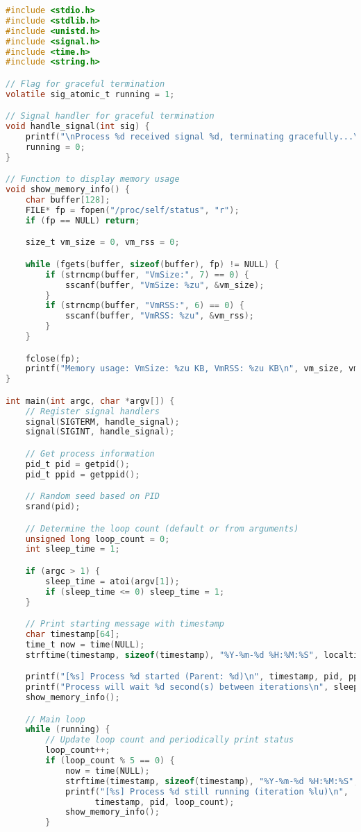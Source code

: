 \documentclass[a4paper,11pt]{article}
\begin{document}
\begin{lstlisting}[language=C, caption=Programa infinite\_loop.c]
#include <stdio.h>
#include <stdlib.h>
#include <unistd.h>
#include <signal.h>
#include <time.h>
#include <string.h>

// Flag for graceful termination
volatile sig_atomic_t running = 1;

// Signal handler for graceful termination
void handle_signal(int sig) {
    printf("\nProcess %d received signal %d, terminating gracefully...\n", getpid(), sig);
    running = 0;
}

// Function to display memory usage
void show_memory_info() {
    char buffer[128];
    FILE* fp = fopen("/proc/self/status", "r");
    if (fp == NULL) return;

    size_t vm_size = 0, vm_rss = 0;

    while (fgets(buffer, sizeof(buffer), fp) != NULL) {
        if (strncmp(buffer, "VmSize:", 7) == 0) {
            sscanf(buffer, "VmSize: %zu", &vm_size);
        }
        if (strncmp(buffer, "VmRSS:", 6) == 0) {
            sscanf(buffer, "VmRSS: %zu", &vm_rss);
        }
    }

    fclose(fp);
    printf("Memory usage: VmSize: %zu KB, VmRSS: %zu KB\n", vm_size, vm_rss);
}

int main(int argc, char *argv[]) {
    // Register signal handlers
    signal(SIGTERM, handle_signal);
    signal(SIGINT, handle_signal);

    // Get process information
    pid_t pid = getpid();
    pid_t ppid = getppid();

    // Random seed based on PID
    srand(pid);

    // Determine the loop count (default or from arguments)
    unsigned long loop_count = 0;
    int sleep_time = 1;

    if (argc > 1) {
        sleep_time = atoi(argv[1]);
        if (sleep_time <= 0) sleep_time = 1;
    }

    // Print starting message with timestamp
    char timestamp[64];
    time_t now = time(NULL);
    strftime(timestamp, sizeof(timestamp), "%Y-%m-%d %H:%M:%S", localtime(&now));

    printf("[%s] Process %d started (Parent: %d)\n", timestamp, pid, ppid);
    printf("Process will wait %d second(s) between iterations\n", sleep_time);
    show_memory_info();

    // Main loop
    while (running) {
        // Update loop count and periodically print status
        loop_count++;
        if (loop_count % 5 == 0) {
            now = time(NULL);
            strftime(timestamp, sizeof(timestamp), "%Y-%m-%d %H:%M:%S", localtime(&now));
            printf("[%s] Process %d still running (iteration %lu)\n",
                  timestamp, pid, loop_count);
            show_memory_info();
        }


\end{lstlisting}
\end{document}
